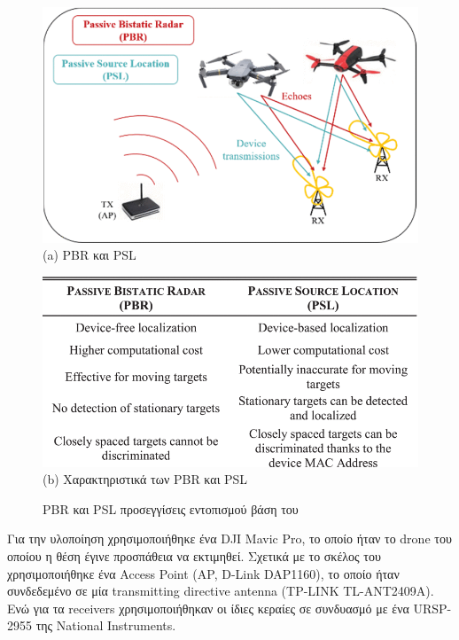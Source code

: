 \begin{figure} [H]
	\centering
		\begin{minipage}{.47\textwidth}
			\centering
			\includegraphics[width=.9\linewidth]{../Images/Related-Work/PBR-and-PSL-approaches.png}\\
			{(a) PBR και PSL }
		\end{minipage}%
		\hspace*{+0.8cm}
		\begin{minipage}{.47\textwidth}
			\centering
			\includegraphics[width=.9\linewidth]{../Images/Related-Work/PBR-and-PSL-Features.png}\\
			{(b) Χαρακτηριστικά των PBR και PSL }
		\end{minipage}
    \hfill \break
    \decoRule
    \caption[PBR και PSL προσεγγίσεις εντοπισμού]{PBR και PSL προσεγγίσεις εντοπισμού βάση του \cite{wifi-passive-active-drone-localization}}
    \label{fig:PBR-and-PSL}
\end{figure}

Για την υλοποίηση χρησιμοποιήθηκε ένα DJI Mavic Pro, το οποίο ήταν το drone του οποίου η θέση έγινε προσπάθεια να εκτιμηθεί.
Σχετικά με το σκέλος του  χρησιμοποιήθηκε ένα Access Point (AP, D-Link DAP1160), το οποίο ήταν συ\-νδε\-δε\-μέ\-νο 
σε μία transmitting directive antenna (TP-LINK TL-ANT2409A). Ενώ για τα receivers χρησιμοποιήθηκαν οι ίδιες κεραίες σε συνδυασμό 
με ένα URSP-2955 της National Instruments.

